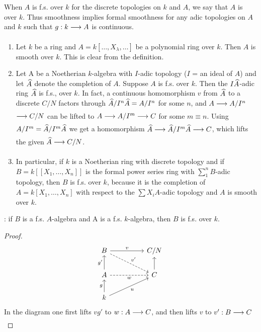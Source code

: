 \documentclass[../main]{subfiles}
\begin{document}
\begin{pardefinition}
 When $A$ is f.s. over $k$ for the discrete topologies on $k$ and $A$, we say that $A$ is  over $k$. Thus smoothness implies formal smoothness for any adic topologies on $A$ and $k$ such that $g: k \varrightarrow{} A$ is continuous.
\end{pardefinition}

\begin{example}
\begin{enumerate}[label = \arabic*.]
  \item Let $k$ be a ring and $A=k[\ldots, X_{\lambda}, \ldots]$ be a polynomial ring over $k$. Then $A$ is smooth over $k$. This is clear from the definition.
  \item Let A be a Noetherian $k$-algebra with $I$-adic topology ($I$ = an ideal of $A$) and let $\widehat{A}$ denote the completion of $A$. Suppose $A$ is f.s. over $k$. Then the $I\widehat{A}$-adic ring $\widehat{A}$ is f.s., over $k$. In fact, a continuous homomorphism $v$ from $\widehat{A}$ to a discrete $C / N$ factors through $\widehat{A} / I^n \widehat{A}=A / I^n$ for some $n$, and $A \varrightarrow{} A / I^n$ $\varrightarrow{} C / N$ can be lifted to $A \varrightarrow{} A / I^m \varrightarrow{} C$ for some $m \equiv n$. Using $A / I^m=\widehat{A} / I^m \widehat{A}$ we get a homomorphism $\completion{A} \varrightarrow{} \completion{A} / I^m \completion{A}\varrightarrow{}C$, which lifts the given $\completion{A} \varrightarrow{} C / N$.
  \item In particular, if $k$ is a Noetherian ring with discrete topology and if $B=k[[X_1, \ldots, X_n]]$ is the formal power series ring with $\sum_1^n B$-adic topology, then $B$ is f.s. over $k$, because it is the completion of $A=k[X_1, \ldots, X_n]$ with respect to the $\sum X_i A$-adic topology and $A$ is smooth over $k$.
\end{enumerate}
\end{example}

\newparagraph {}: if $B$ is a f.s. $A$-algebra and A is a f.s. $k$-algebra, then $B$ is f.s. over $k$.

\begin{proof}
\[
\begin{tikzcd}
	B && {C/N} \\
	A && C \\
	k
	\arrow["g", from=3-1, to=2-1]
	\arrow["{g'}", from=2-1, to=1-1]
	\arrow["v", from=1-1, to=1-3]
	\arrow[from=2-3, to=1-3]
	\arrow["u"', from=3-1, to=2-3]
	\arrow["w"', dashed, from=2-1, to=2-3]
	\arrow["{v'}", dashed, from=1-1, to=2-3]
\end{tikzcd}\]
In the diagram one first lifts $vg'$ to $w:A\varrightarrow{}C$, and then lifts $v$ to \newline $v':B\varrightarrow{}C$
\end{proof}
\end{document}
